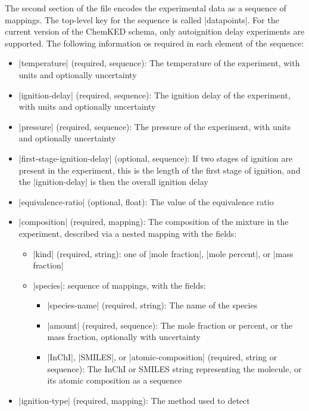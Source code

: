 \documentclass[12pt]{ijck}
\newcommand\ck{ChemKED}
\begin{document}
The second section of the file encodes the experimental data as a sequence of mappings. The
top-level key for the sequence is called \yabox|datapoints|. For the current version of the \ck{}
schema, only autoignition delay experiments are supported. The following information os required in
each element of the sequence:
%
\begin{itemize}
    \item \yabox|temperature| (required, sequence): The temperature of the
    experiment, with units and optionally uncertainty
    \item \yabox|ignition-delay| (required, sequence): The ignition delay of the
    experiment, with units and optionally uncertainty
    \item \yabox|pressure| (required, sequence): The pressure of the experiment,
    with units and optionally uncertainty
    \item \yabox|first-stage-ignition-delay| (optional, sequence): If two stages of ignition are
    present in the experiment, this is the length of the first stage of ignition, and the
    \yabox|ignition-delay| is then the overall ignition delay
    \item \yabox|equivalence-ratio| (optional, float): The value of the equivalence ratio
    \item \yabox|composition| (required, mapping): The composition of the
    mixture in the experiment, described via a nested mapping with the fields:
    \begin{itemize}
        \item \yabox|kind| (required, string): one of \yabox|mole fraction|, \yabox|mole percent|, or \yabox|mass fraction|
        \item \yabox|species|: sequence of mappings, with the fields:
        \begin{itemize}
            \item \yabox|species-name| (required, string): The name of the species
            \item \yabox|amount| (required, sequence): The mole fraction or percent, or the mass fraction, optionally with uncertainty
            \item \yabox|InChI|, \yabox|SMILES|, or \yabox|atomic-composition|
            (required, string or sequence): The InChI
            or SMILES string representing the molecule, or its atomic
            composition as a sequence
        \end{itemize}
    \end{itemize}
    \item \yabox|ignition-type| (required, mapping): The method used to detect

\end{itemize}
\end{document}
